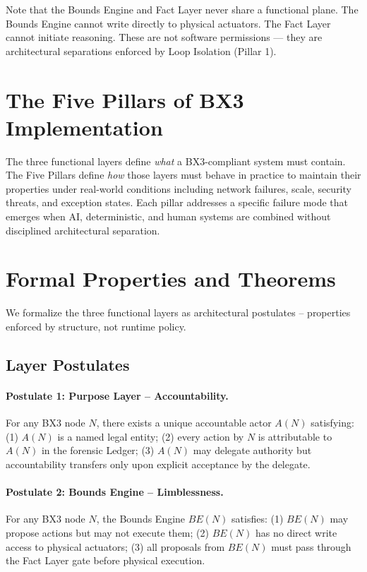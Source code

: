\documentclass[12pt]{article}
\begin{document}
\vspace{0.5em}
\noindent Note that the Bounds Engine and Fact Layer never share a functional plane. The Bounds Engine cannot write directly to physical actuators. The Fact Layer cannot initiate reasoning. These are not software permissions --- they are architectural separations enforced by Loop Isolation (Pillar 1).

\section{The Five Pillars of BX3 Implementation}
\label{sec:pillars}

The three functional layers define \textit{what} a BX3-compliant system must contain. The Five Pillars define \textit{how} those layers must behave in practice to maintain their properties under real-world conditions including network failures, scale, security threats, and exception states. Each pillar addresses a specific failure mode that emerges when AI, deterministic, and human systems are combined without disciplined architectural separation.


\section{Formal Properties and Theorems}
\label{sec:properties}
We formalize the three functional layers as architectural postulates -- properties enforced by structure, not runtime policy.

\subsection{Layer Postulates}

\paragraph{Postulate 1: Purpose Layer -- Accountability.}
\label{post:p1}
For any BX3 node $N$, there exists a unique accountable actor $A(N)$ satisfying: (1) $A(N)$ is a named legal entity; (2) every action by $N$ is attributable to $A(N)$ in the forensic Ledger; (3) $A(N)$ may delegate authority but accountability transfers only upon explicit acceptance by the delegate.

\paragraph{Postulate 2: Bounds Engine -- Limblessness.}
\label{post:p2}
For any BX3 node $N$, the Bounds Engine $BE(N)$ satisfies: (1) $BE(N)$ may propose actions but may not execute them; (2) $BE(N)$ has no direct write access to physical actuators; (3) all proposals from $BE(N)$ must pass through the Fact Layer gate before physical execution.
\end{document}
